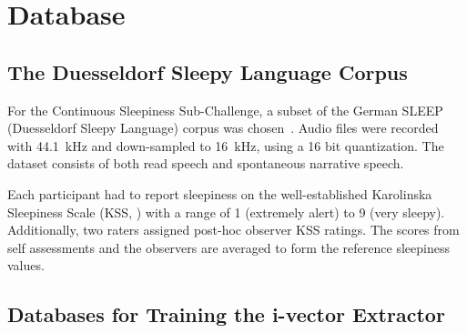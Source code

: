\section{Database}

\subsection{The Duesseldorf Sleepy Language Corpus}

For the Continuous Sleepiness Sub-Challenge, a subset of the German SLEEP (Duesseldorf Sleepy Language) corpus was chosen~\cite{schullerinterspeech}. Audio files were recorded with 44.1~kHz and down-sampled to 16~kHz, using a 16 bit quantization. The dataset consists of both read speech and spontaneous narrative speech. 

Each participant had to report sleepiness on the well-established Karolinska Sleepiness Scale (KSS, \cite{aakerstedt1990subjective}) with a range of 1 (extremely alert) to 9 (very sleepy). Additionally, two raters assigned post-hoc observer KSS ratings.  The scores from self assessments and the observers are averaged to form the reference sleepiness values. 



\subsection{Databases for Training the i-vector Extractor}

